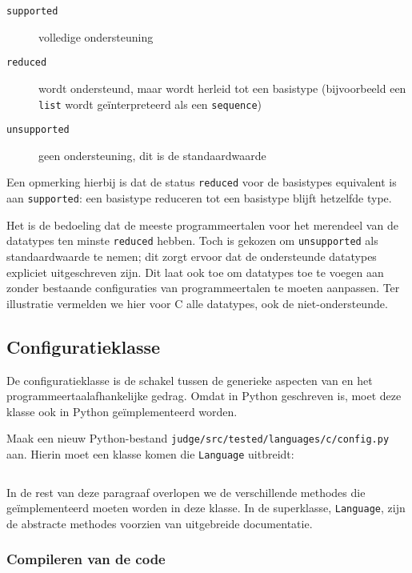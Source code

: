 \begin{description}
    \item[\texttt{supported}] volledige ondersteuning
    \item[\texttt{reduced}] wordt ondersteund, maar wordt herleid tot een basistype (bijvoorbeeld een \texttt{list} wordt geïnterpreteerd als een \texttt{sequence})
    \item[\texttt{unsupported}] geen ondersteuning, dit is de standaardwaarde
\end{description}

Een opmerking hierbij is dat de status \texttt{reduced} voor de basistypes equivalent is aan \texttt{supported}: een basistype reduceren tot een basistype blijft hetzelfde type.

Het is de bedoeling dat de meeste programmeertalen voor het merendeel van de datatypes ten minste \texttt{reduced} hebben.
Toch is gekozen om \texttt{unsupported} als standaardwaarde te nemen;
dit zorgt ervoor dat de ondersteunde datatypes expliciet uitgeschreven zijn.
Dit laat ook toe om datatypes toe te voegen aan \tested{} zonder bestaande configuraties van programmeertalen te moeten aanpassen.
Ter illustratie vermelden we hier voor C alle datatypes, ook de niet-ondersteunde.

\subsection{Configuratieklasse}\label{subsec:configuratieklasse}

De configuratieklasse is de schakel tussen de generieke aspecten van \tested{} en het programmeertaalafhankelijke gedrag.
Omdat \tested{} in Python geschreven is, moet deze klasse ook in Python geïmplementeerd worden.

Maak een nieuw Python-bestand \texttt{judge/src/tested/languages/c/config.py} aan.
Hierin moet een klasse komen die \texttt{Language} uitbreidt:

\inputminted[firstline=10,lastline=10]{python}{sources/c-config.py}

In de rest van deze paragraaf overlopen we de verschillende methodes die geïmplementeerd moeten worden in deze klasse.
In de superklasse, \texttt{Language}, zijn de abstracte methodes voorzien van uitgebreide documentatie.

\subsubsection{Compileren van de code}

